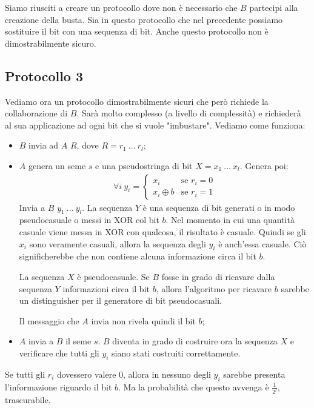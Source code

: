 \noindent Siamo riusciti a creare un protocollo dove non è necessario che $B$ partecipi alla creazione della busta. Sia in questo protocollo che nel precedente possiamo sostituire il bit con una sequenza di bit. Anche questo protocollo non è dimostrabilmente sicuro.

\subsection{Protocollo 3}
Vediamo ora un protocollo dimostrabilmente sicuri che però richiede la collaborazione di $B$. Sarà molto complesso (a livello di complessità) e richiederà al sua applicazione ad ogni bit che si vuole "imbustare". Vediamo come funziona:
\begin{itemize}
    \item $B$ invia ad $A$ $R$, dove $R=r_1 \ ... \ r_l$;
    \item $A$ genera un seme $s$ e una pseudostringa di bit $X = x_1 \ ... \ x_l$. Genera poi:
    \begin{align*}
        \forall i \ y_i = \begin{cases} 
            x_i & \mbox{se }r_i = 0 \\ 
            x_i \oplus b & \mbox{se }r_i = 1
        \end{cases} 
    \end{align*}
    Invia a $B$ $y_1 \ ... \ y_l$. La sequenza $Y$ è una sequenza di bit generati o in modo pseudocasuale o messi in XOR col bit $b$. Nel momento in cui una quantità casuale viene messa in XOR con qualcosa, il risultato è casuale. Quindi se gli $x_i$ sono veramente casuali, allora la sequenza degli $y_i$ è anch'essa casuale. Ciò significherebbe che non contiene alcuna informazione circa il bit $b$.

    La sequenza $X$ è pseudocasuale. Se $B$ fosse in grado di ricavare dalla sequenza $Y$ informazioni circa il bit $b$, allora l'algoritmo per ricavare $b$ sarebbe un distinguisher per il generatore di bit pseudocasuali. 
    
    Il messaggio che $A$ invia non rivela quindi il bit $b$;
    \item $A$ invia a $B$ il seme $s$. $B$ diventa in grado di costruire ora la sequenza $X$ e verificare che tutti gli $y_i$ siano stati costruiti correttamente. 
\end{itemize}

\noindent Se tutti gli $r_i$ dovessero valere $0$, allora in nessuno degli $y_i$ sarebbe presenta l'informazione riguardo il bit $b$. Ma la probabilità che questo avvenga è $\frac{1}{2^l}$, trascurabile. 
\\

